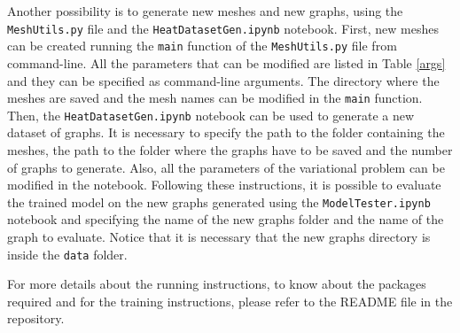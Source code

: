 \documentclass[11pt,a4paper]{article}
\begin{document}
Another possibility is to generate new meshes and new graphs, using the \texttt{MeshUtils.py} file and the \texttt{HeatDatasetGen.ipynb} notebook. 
First, new meshes can be created running the \texttt{main} function of the \texttt{MeshUtils.py} file from command-line. All the parameters that can be modified are listed in Table \ref{args} and they can be specified as command-line arguments. The directory where the meshes are saved and the mesh names can be modified in the \texttt{main} function. 
Then, the \texttt{HeatDatasetGen.ipynb} notebook can be used to generate a new dataset of graphs. It is necessary to specify the path to the folder containing the meshes, the path to the folder where the graphs have to be saved and the number of graphs to generate. Also, all the parameters of the variational problem can be modified in the notebook. 
Following these instructions, it is possible to evaluate the trained model on the new graphs generated using the \texttt{ModelTester.ipynb} notebook and specifying the name of the new graphs folder and the name of the graph to evaluate. Notice that it is necessary that the new graphs directory is inside the \texttt{data} folder.

For more details about the running instructions, to know about the packages required and for the training instructions, please refer to the README file in the repository.

\end{document}

